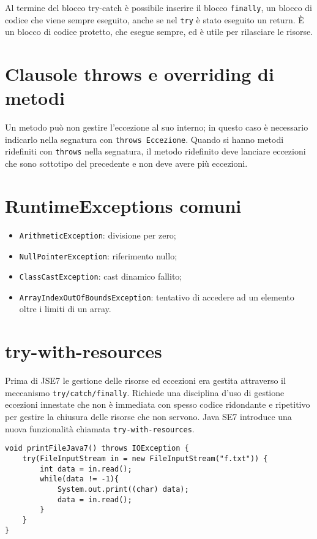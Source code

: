 Al termine del blocco try-catch è possibile inserire il blocco \texttt{finally}, un blocco di codice che viene sempre eseguito, anche se nel \texttt{try} è stato eseguito un return. È un blocco di codice protetto, che esegue sempre, ed è utile per rilasciare le risorse.

\section{Clausole throws e overriding di metodi}
Un metodo può non gestire l'eccezione al suo interno; in questo caso è necessario indicarlo nella segnatura con \texttt{throws Eccezione}.
Quando si hanno metodi ridefiniti con \texttt{throws} nella segnatura, il metodo ridefinito deve lanciare eccezioni che sono sottotipo del precedente e non deve avere più eccezioni. 

\section{RuntimeExceptions comuni}
\begin{itemize}
\item \texttt{ArithmeticException}: divisione per zero;
\item \texttt{NullPointerException}: riferimento nullo;
\item \texttt{ClassCastException}: cast dinamico fallito;
\item \texttt{ArrayIndexOutOfBoundsException}: tentativo di accedere ad un elemento oltre i limiti di un array.
\end{itemize}

\section{try-with-resources}
Prima di JSE7 le gestione delle risorse ed eccezioni era gestita attraverso il meccanismo \texttt{try/catch/finally}. Richiede una disciplina d'uso di gestione eccezioni innestate che non \`e immediata con spesso codice ridondante e ripetitivo per gestire la chiusura delle risorse che non servono. Java SE7 introduce una nuova funzionalit\`a chiamata \texttt{try-with-resources}.
 
\begin{lstlisting}
void printFileJava7() throws IOException {
	try(FileInputStream in = new FileInputStream("f.txt")) {
		int data = in.read();
		while(data != -1){
			System.out.print((char) data);
			data = in.read();
		}
	}
}
\end{lstlisting}

